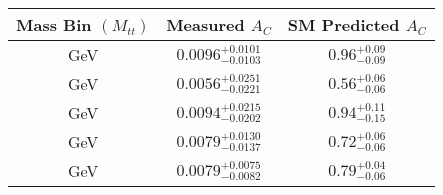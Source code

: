 \begin{tabular}{|c|c|c|} 
\hline
Mass Bin $(M_{tt})$ & Measured $A_C$ & SM Predicted $A_C$ \\ 
\hline
[1000,1500] GeV & $0.0096^{+0.0101}_{-0.0103}$ & $0.96^{+0.09}_{-0.09}$ \\ 
[0,500] GeV & $0.0056^{+0.0251}_{-0.0221}$ & $0.56^{+0.06}_{-0.06}$ \\ 
[1500,Inf] GeV & $0.0094^{+0.0215}_{-0.0202}$ & $0.94^{+0.11}_{-0.15}$ \\ 
[500,750] GeV & $0.0079^{+0.0130}_{-0.0137}$ & $0.72^{+0.06}_{-0.06}$ \\ 
[750,1000] GeV & $0.0079^{+0.0075}_{-0.0082}$ & $0.79^{+0.04}_{-0.06}$ \\ 
\hline
\end{tabular}